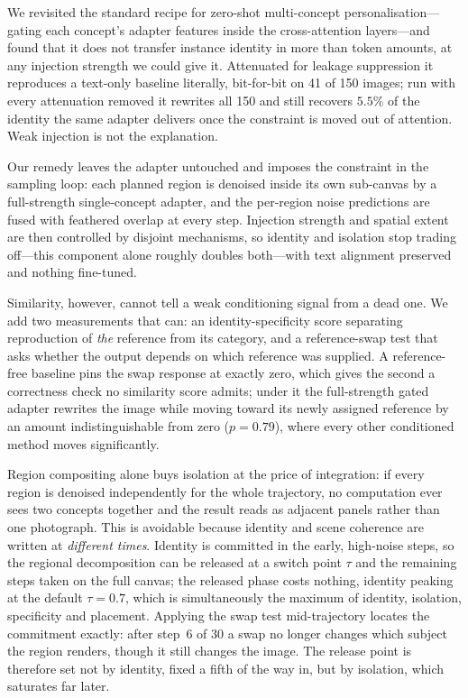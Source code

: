 \documentclass[10pt,twocolumn,letterpaper]{article}
\begin{document}
We revisited the standard recipe for zero-shot multi-concept
personalisation---gating each concept's adapter features inside the
cross-attention layers---and found that it does not transfer instance identity
in more than token amounts, at any injection strength we could give it.
Attenuated for leakage suppression it reproduces a text-only baseline
literally, bit-for-bit on 41 of 150 images; run with every attenuation removed
it rewrites all 150 and still recovers $5.5\%$ of the identity the same
adapter delivers once the constraint is moved out of attention.  Weak
injection is not the explanation.

Our remedy leaves the adapter untouched and imposes the constraint in the
sampling loop: each planned region is denoised inside its own sub-canvas by a
full-strength single-concept adapter, and the per-region noise predictions are
fused with feathered overlap at every step.  Injection strength and spatial
extent are then controlled by disjoint mechanisms, so identity and isolation
stop trading off---this component alone roughly doubles both---with text
alignment preserved and nothing fine-tuned.

Similarity, however, cannot tell a weak conditioning signal from a dead one.
We add two measurements that can: an identity-specificity score separating
reproduction of \emph{the} reference from its category, and a reference-swap
test that asks whether the output depends on which reference was supplied.  A
reference-free baseline pins the swap response at exactly zero, which gives
the second a correctness check no similarity score admits; under it the
full-strength gated adapter rewrites the image while moving toward its newly
assigned reference by an amount indistinguishable from zero ($p{=}0.79$),
where every other conditioned method moves significantly.

Region compositing alone buys isolation at the price of integration: if
every region is denoised independently for the whole trajectory, no
computation ever sees two concepts together and the result reads as adjacent
panels rather than one photograph.  This is avoidable because identity and
scene coherence are written at \emph{different times}.  Identity is committed
in the early, high-noise steps, so the regional decomposition can be released
at a switch point $\tau$ and the remaining steps taken on the full canvas; the
released phase costs nothing, identity peaking at the default $\tau{=}0.7$,
which is simultaneously the maximum of identity, isolation, specificity and
placement.  Applying the swap test mid-trajectory locates the commitment
exactly: after step~6 of 30 a swap no longer changes which subject the region
renders, though it still changes the image.  The release point is therefore
set not by identity, fixed a fifth of the way in, but by isolation, which
saturates far later.
\end{document}
